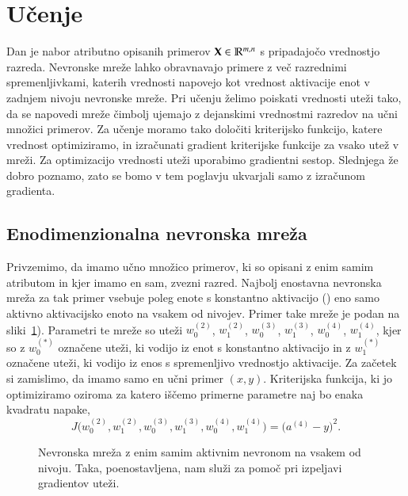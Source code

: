 \section{Učenje}

Dan je nabor atributno opisanih primerov $\mathbf{X}\in\mathbb{R}^{m,n}$ s pripadajočo vrednostjo razreda. Nevronske mreže lahko obravnavajo primere z več razrednimi spremenljivkami, katerih vrednosti napovejo kot vrednost aktivacije enot v zadnjem nivoju nevronske mreže. Pri učenju želimo poiskati vrednosti uteži tako, da se napovedi mreže čimbolj ujemajo z dejanskimi vrednostmi razredov na učni množici primerov. Za učenje moramo tako določiti kriterijsko funkcijo, katere vrednost optimiziramo, in izračunati gradient kriterijske funkcije za vsako utež v mreži. Za optimizacijo vrednosti uteži uporabimo gradientni sestop. Slednjega že dobro poznamo, zato se bomo v tem poglavju ukvarjali samo z izračunom gradienta.

\subsection{Enodimenzionalna nevronska mreža}

Privzemimo, da imamo učno množico primerov, ki so opisani z enim samim atributom in kjer imamo en sam, zvezni razred. Najbolj enostavna nevronska mreža za tak primer vsebuje poleg enote s konstantno aktivacijo () eno samo aktivno aktivacijsko enoto na vsakem od nivojev. Primer take mreže je podan na sliki~\ref{f-nn-lin}). Parametri te mreže so uteži $w_0^{(2)}$, $w_1^{(2)}$, $w_0^{(3)}$, $w_1^{(3)}$, $w_0^{(4)}$, $w_1^{(4)}$, kjer so z $w_0^{(*)}$ označene uteži, ki vodijo iz enot s konstantno aktivacijo in z $w_1^{(*)}$ označene uteži, ki vodijo iz enos s spremenljivo vrednostjo aktivacije. Za začetek si zamislimo, da imamo samo en učni primer $(x,y)$. Kriterijska funkcija, ki jo optimiziramo oziroma za katero iščemo primerne parametre naj bo enaka kvadratu napake,
\begin{equation}
J\big(w_0^{(2)}, w_1^{(2)}, w_0^{(3)}, w_1^{(3)}, w_0^{(4)}, w_1^{(4)}\big)=\big(a^{(4)}-y\big)^2.
\end{equation}

\begin{figure}[htbp]
\label{f-nn-lin}
\caption{Nevronska mreža z enim samim aktivnim nevronom na vsakem od nivoju. Taka, poenostavljena, nam služi za pomoč pri izpeljavi gradientov uteži.}
\end{figure}


